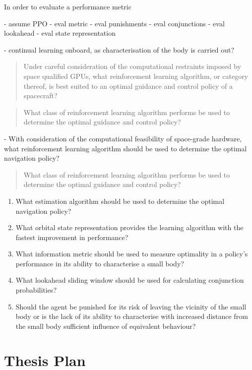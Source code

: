 In order to evaluate a performance metric 

- assume PPO
- eval metric
- eval punishments
- eval conjunctions
- eval lookahead
- eval state representation


- continual learning onboard, as characterisation of the body is carried out?


\begin{quote}
    Under careful consideration of the computational restraints imposed by space qualified \glspl{GPU}, what reinforcement learning algorithm, or category thereof, is best suited to an optimal guidance and control policy of a spacecraft?
\end{quote}

\begin{quote}
    What class of reinforcement learning algorithm performs be used to determine the optimal guidance and control policy?
\end{quote}


- With consideration of the computational feasibility of space-grade hardware, what reinforcement learning algorithm should be used to determine the optimal navigation policy?

\begin{quote}
    What class of reinforcement learning algorithm performs be used to determine the optimal guidance and control policy?
\end{quote}

\begin{enumerate}
    \item What estimation algorithm should be used to determine the optimal navigation policy?
    \item What orbital state representation provides the learning algorithm with the fastest improvement in performance? 
    \item What information metric should be used to measure optimality in a policy's performance in its ability to characterise a small body?
    \item What lookahead sliding window should be used for calculating conjunction probabilities?
    \item Should the agent be punished for its risk of leaving the vicinity of the small body or is the lack of its ability to characterise with increased distance from the small body sufficient influence of equivalent behaviour?
\end{enumerate}

\section{Thesis Plan}

